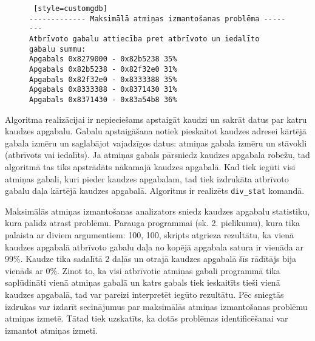 \begin{figure}[h]
\begin{lstlisting} [style=customgdb]
------------- Maksimālā atmiņas izmantošanas problēma --------
Atbrīvoto gabalu attiecība pret atbrīvoto un iedalīto gabalu summu:
Apgabals 0x8279000 - 0x82b5238 35%
Apgabals 0x82b5238 - 0x82f32e0 31%
Apgabals 0x82f32e0 - 0x8333388 35%
Apgabals 0x8333388 - 0x8371430 31%
Apgabals 0x8371430 - 0x83a54b8 36%
\end{lstlisting}
\caption{\textbf{\fontsize{11}{12}\selectfont {Maksimālā atmiņas izmantošanas rādītājs}}}
\end{figure}

Algoritma realizācijai ir nepieciešams apstaigāt kaudzi un sakrāt datus par katru kaudzes apgabalu.
Gabalu apstaigāšana notiek pieskaitot kaudzes adresei kārtējā gabala izmēru un saglabājot vajadzīgos datus: atmiņas gabala izmēru un stāvokli (atbrīvots vai iedalīts).
Ja atmiņas gabals pārsniedz kaudzes apgabala robežu, tad algoritmā tas tiks apstrādāts nākamajā kaudzes apgabalā.
Kad tiek iegūti visi atmiņas gabali, kuri pieder kaudzes apgabalam, tad tiek izdrukāta atbrīvoto gabalu daļa kārtējā kaudzes apgabalā.
Algoritms ir realizēts \texttt{div\_stat} komandā.

Maksimālās atmiņas izmantošanas analizators sniedz kaudzes apgabalu statistiku, kura palīdz atrast problēmu.
Parauga programmai (sk. 2. pielikumu), kura tika palaista ar diviem argumentiem: 100, 100, skripts atgrieza rezultātu, ka vienā kaudzes apgabalā atbrīvoto gabalu daļa no kopējā apgabala satura ir vienāda ar 99\%.
Kaudze tika sadalītā 2 daļās un otrajā kaudzes apgabalā šīs rādītājs bija vienāds ar 0\%. 
Zinot to, ka visi atbrīvotie atmiņas gabali programmā tika saplūdināti vienā atmiņas gabalā un katrs gabals tiek ieskaitīts tieši vienā kaudzes apgabalā, tad var pareizi interpretēt iegūto rezultātu.
Pēc sniegtās izdrukas var izdarīt secinājumus par maksimālās atmiņas izmantošanas problēmu atmiņas izmetē.
Tātad tiek uzskatīts, ka dotās problēmas identificēšanai var izmantot atmiņas izmeti.

